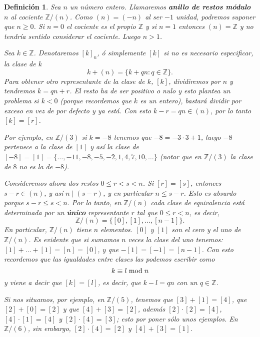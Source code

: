 \documentclass[12pt]{article}
\newtheorem{definition}[theorem]{Definición}
\begin{document}
\begin{definition} Sea $n$ un número entero. Llamaremos \textbf{anillo de restos módulo $n$} al cociente $\mathbb{Z}/(n)$. Como $(n) = (-n)$ al ser $-1$ unidad, podremos suponer que $n \geq 0$. Si $n = 0$ el cociente es el propio $\mathbb{Z}$ y si $n=1$ entonces $(n) = \mathbb{Z}$  y no tendría sentido considerar el cociente. Luego $n >1$.

Sea $k \in \mathbb{Z}$. Denotaremos $[k]_{n}$, ó simplemente $[k]$ si no es necesario especificar, la clase de $k$ $$k + (n) = \lbrace k + qn: q \in \mathbb{Z}\rbrace.$$ 
Para obtener otro representante de la clase de $k$, $[k]$, dividiremos por $n$ y tendremos $k = qn + r$. El resto ha de ser positivo o nulo y esto plantea un problema si $k <0$ (porque recordemos que $k$ es un entero), bastará dividir por exceso en vez de por defecto y ya está. Con esto $k -r = qn \in (n)$, por lo tanto $[k] = [r]$. 

Por ejemplo, en $\mathbb{Z}/(3)$ si $k = -8$ tenemos que $-8 = -3 \cdot 3 + 1$, luego $-8$ pertenece a la clase de $[1]$ y así la clase de $[-8] = [1] = \lbrace \ldots, -11, -8, -5, -2, 1, 4, 7, 10, \ldots \rbrace$ (notar que en $\mathbb{Z}/(3)$ la clase de $8$ no es la de $-8$). 

Consideremos ahora dos restos $0 \leq r < s < n$. Si $[r] = [s]$, entonces $s-r \in (n)$, y así $n \mid (s-r)$, y en particular $n  \leq s-r$. Esto es absurdo porque $s-r \leq s < n$. Por lo tanto, en $\mathbb{Z}/(n)$ cada clase de equivalencia está determinada por un \textbf{único} representante $r$ tal que $0 \leq r <n$, es decir, $$\mathbb{Z}/(n) = \lbrace [0], [1], \ldots, [n-1] \rbrace.$$
En particular, $\mathbb{Z}/(n)$ tiene $n$ elementos. $[0]$ y $[1]$ son el cero y el uno de $\mathbb{Z}/(n)$. Es evidente que si sumamos $n$ veces la clase del uno tenemos: $[1] + \ldots +[1] = [n] = [0]$, y que $-[1] = [-1] = [n-1]$. Con esto recordemos que las igualdades entre clases las podemos escribir como $$k \equiv l \hspace{0.1cm}\text{mod}\hspace{0.1cm} n$$ y viene a decir que $[k] = [l]$, es decir, que $k-l = qn$ con un $q \in \mathbb{Z}$. 

Si nos situamos, por ejemplo, en $\mathbb{Z}/(5)$, tenemos que $[3] + [1] = [4]$, que $[2] + [0] = [2]$ y que $[4]+ [3] = [2]$, además $[2] \cdot [2] = [4]$, $[4] \cdot [1] = [4]$ y $[2] \cdot [4] = [3]$; esto por poner sólo unos ejemplos. En $\mathbb{Z}/(6)$, sin embargo, $[2] \cdot [4] = [2]$ y $[4] + [3] = [1]$.
\end{definition}
\end{document}
